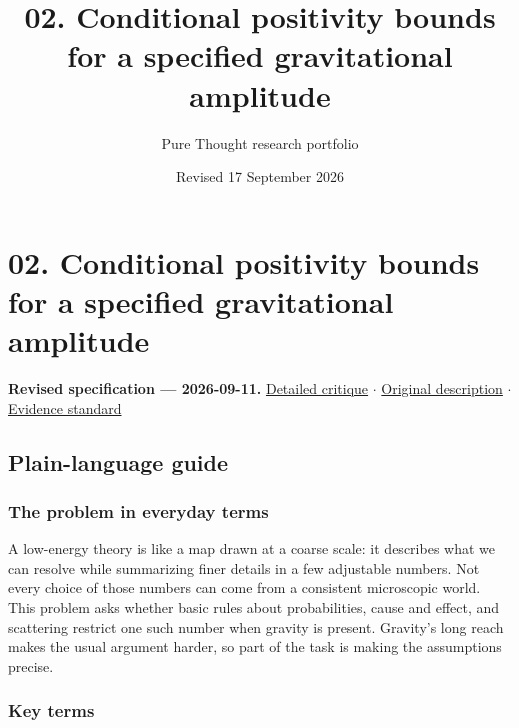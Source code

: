 \documentclass[
  11pt,
]{article}
\title{02. Conditional positivity bounds for a specified gravitational
amplitude}
\author{Pure Thought research portfolio}
\date{Revised 17 September 2026}
\begin{document}
\maketitle
\thispagestyle{empty}
\clearpage

\section{02. Conditional positivity bounds for a specified gravitational
amplitude}

\textbf{Revised specification --- 2026-09-11.}
\href{https://github.com/rick-stevens-ai/Pure-Thought/blob/main/reviews/02-Gravitational-Positivity-Bounds.md}{Detailed
critique} \ensuremath{\cdot}
\href{https://github.com/rick-stevens-ai/Pure-Thought/blob/main/archive/original-PRDs/02-Gravitational-Positivity-Bounds.md}{Original
description} \ensuremath{\cdot}
\href{https://github.com/rick-stevens-ai/Pure-Thought/blob/main/reviews/EVIDENCE-STANDARD.md}{Evidence
standard}

\subsection{Plain-language guide}

\subsubsection{The problem in everyday terms}

A low-energy theory is like a map drawn at a coarse scale: it describes
what we can resolve while summarizing finer details in a few adjustable
numbers. Not every choice of those numbers can come from a consistent
microscopic world. This problem asks whether basic rules about
probabilities, cause and effect, and scattering restrict one such number
when gravity is present. Gravity's long reach makes the usual argument
harder, so part of the task is making the assumptions precise.

\subsubsection{Key terms}
\end{document}
